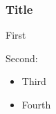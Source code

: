 \documentclass{beamer}
\begin{document}
\begin{frame}
    \frametitle{Title}
    First\pause

    Second:
    \begin{itemize}[<+(1)->]
        \item Third
        \item Fourth
    \end{itemize}
\end{frame}
\end{document}
